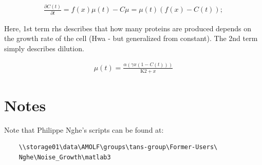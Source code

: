 \documentclass[a4paper,twoside,10pt]{report}
\begin{document}
\begin{align}
\frac{\partial C(t)}{\partial t}=f(x) \mu (t)-C \mu =\mu (t) \left(f(x)-C(t)\right);
\end{align}

Here, 1st term rhs describes that how many proteins are produced depends on the growth rate of the cell (Hwa - but generalized from constant). The 2nd term simply describes dilution.

\begin{align}
\mu (t)=\frac{\alpha  \left(\gamma  x \left(1-C(t)\right)\right)}{\text{K2}+x}
\end{align}

\section{Notes}

Note that Philippe Nghe's scripts can be found at:

\begin{verbatim}
    \\storage01\data\AMOLF\groups\tans-group\Former-Users\
    Nghe\Noise_Growth\matlab3
\end{verbatim}





\addtocontents{toc}{\protect\vspace*{\baselineskip}}



%

\appendix

\end{document}
